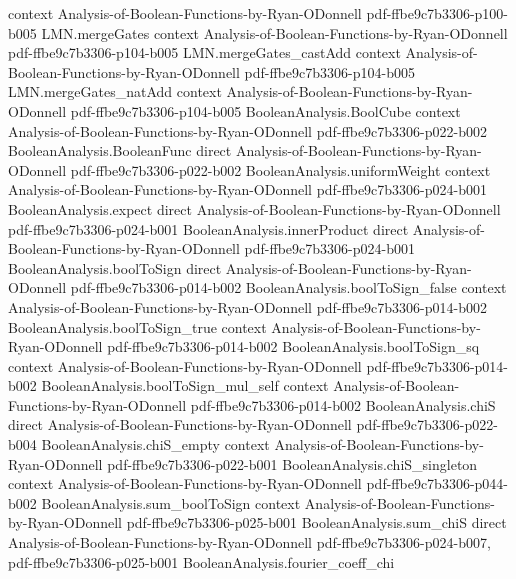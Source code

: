 \begin{lemma}
  {context}
  {Analysis-of-Boolean-Functions-by-Ryan-ODonnell}
  {pdf-ffbe9c7b3306-p100-b005}
\proofstep
  {LMN.mergeGates}
  {context}
  {Analysis-of-Boolean-Functions-by-Ryan-ODonnell}
  {pdf-ffbe9c7b3306-p104-b005}
\proofstep
  {LMN.mergeGates_castAdd}
  {context}
  {Analysis-of-Boolean-Functions-by-Ryan-ODonnell}
  {pdf-ffbe9c7b3306-p104-b005}
\proofstep
  {LMN.mergeGates_natAdd}
  {context}
  {Analysis-of-Boolean-Functions-by-Ryan-ODonnell}
  {pdf-ffbe9c7b3306-p104-b005}
\proofstep
  {BooleanAnalysis.BoolCube}
  {context}
  {Analysis-of-Boolean-Functions-by-Ryan-ODonnell}
  {pdf-ffbe9c7b3306-p022-b002}
\proofstep
  {BooleanAnalysis.BooleanFunc}
  {direct}
  {Analysis-of-Boolean-Functions-by-Ryan-ODonnell}
  {pdf-ffbe9c7b3306-p022-b002}
\proofstep
  {BooleanAnalysis.uniformWeight}
  {context}
  {Analysis-of-Boolean-Functions-by-Ryan-ODonnell}
  {pdf-ffbe9c7b3306-p024-b001}
\proofstep
  {BooleanAnalysis.expect}
  {direct}
  {Analysis-of-Boolean-Functions-by-Ryan-ODonnell}
  {pdf-ffbe9c7b3306-p024-b001}
\proofstep
  {BooleanAnalysis.innerProduct}
  {direct}
  {Analysis-of-Boolean-Functions-by-Ryan-ODonnell}
  {pdf-ffbe9c7b3306-p024-b001}
\proofstep
  {BooleanAnalysis.boolToSign}
  {direct}
  {Analysis-of-Boolean-Functions-by-Ryan-ODonnell}
  {pdf-ffbe9c7b3306-p014-b002}
\proofstep
  {BooleanAnalysis.boolToSign_false}
  {context}
  {Analysis-of-Boolean-Functions-by-Ryan-ODonnell}
  {pdf-ffbe9c7b3306-p014-b002}
\proofstep
  {BooleanAnalysis.boolToSign_true}
  {context}
  {Analysis-of-Boolean-Functions-by-Ryan-ODonnell}
  {pdf-ffbe9c7b3306-p014-b002}
\proofstep
  {BooleanAnalysis.boolToSign_sq}
  {context}
  {Analysis-of-Boolean-Functions-by-Ryan-ODonnell}
  {pdf-ffbe9c7b3306-p014-b002}
\proofstep
  {BooleanAnalysis.boolToSign_mul_self}
  {context}
  {Analysis-of-Boolean-Functions-by-Ryan-ODonnell}
  {pdf-ffbe9c7b3306-p014-b002}
\proofstep
  {BooleanAnalysis.chiS}
  {direct}
  {Analysis-of-Boolean-Functions-by-Ryan-ODonnell}
  {pdf-ffbe9c7b3306-p022-b004}
\proofstep
  {BooleanAnalysis.chiS_empty}
  {context}
  {Analysis-of-Boolean-Functions-by-Ryan-ODonnell}
  {pdf-ffbe9c7b3306-p022-b001}
\proofstep
  {BooleanAnalysis.chiS_singleton}
  {context}
  {Analysis-of-Boolean-Functions-by-Ryan-ODonnell}
  {pdf-ffbe9c7b3306-p044-b002}
\proofstep
  {BooleanAnalysis.sum_boolToSign}
  {context}
  {Analysis-of-Boolean-Functions-by-Ryan-ODonnell}
  {pdf-ffbe9c7b3306-p025-b001}
\proofstep
  {BooleanAnalysis.sum_chiS}
  {direct}
  {Analysis-of-Boolean-Functions-by-Ryan-ODonnell}
  {pdf-ffbe9c7b3306-p024-b007,
    pdf-ffbe9c7b3306-p025-b001}
\proofstep
  {BooleanAnalysis.fourier_coeff_chi}

\end{lemma}
